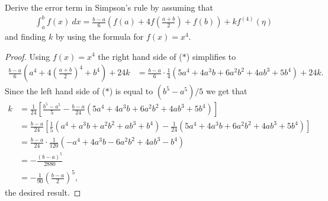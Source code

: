 \documentclass[8pt]{article}
\theoremstyle{definition}
\newenvironment{exercise}[1]
  {\renewcommand\theinnerexercise{#1}\innerexercise}
  {\endinnerexercise}
\begin{document}
\begin{exercise}{4}
Derive the error term in Simpson's rule by assuming that
\begin{align*}
\int_{a}^{b} f(x) \ dx = \frac{b - a}{6} \left( f(a) + 4 f \left( \frac{a + b}{2} \right) + f(b) \right) + k f^{(4)} (\eta) \tag{$\ast$}
\end{align*}
and finding $k$ by using the formula for $f(x) = x^4$. 
\end{exercise}

\begin{proof}
Using $f(x) = x^4$ the right hand side of ($\ast$) simplifies to
\begin{align}
\nonumber \frac{b - a}{6} \left( a^4 + 4 \left( \frac{a + b}{2} \right)^4 + b^4 \right) + 24 k &= \frac{b - a}{6} \cdot \frac{1}{4} (5 a^4 + 4 a^3 b + 6 a^2 b^2 + 4 a b^3 + 5 b^4) + 24 k.
\end{align}
Since the left hand side of ($\ast$) is equal to $(b^5 - a^5)/5$ we get that
\begin{align*}
k &= \frac{1}{24} \left[ \frac{b^5 - a^5}{5} - \frac{b - a}{24} (5 a^4 + 4 a^3 b + 6 a^2 b^2 + 4 a b^3 + 5 b^4) \right] \\
&= \frac{b - a}{24} \left[ \frac{1}{5} (a^4 + a^3 b + a^2 b^2 + a b^3 + b^4) - \frac{1}{24} (5 a^4 + 4 a^3 b + 6 a^2 b^2 + 4 a b^3 + 5 b^4) \right] \\
&= \frac{b - a}{24} \cdot \frac{1}{120} (-a^4 + 4 a^3 b - 6 a^2 b^2 + 4 a b^3 - b^4) \\
&= - \frac{(b - a)^5}{2880} \\
&= - \frac{1}{90} \left( \frac{b - a}{2} \right)^5,
\end{align*}
the desired result.
\end{proof}
\end{document}
